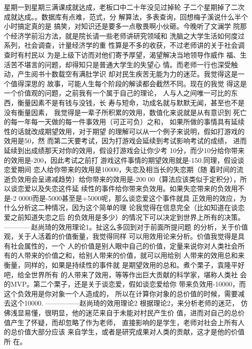星期一到星期三满课成就达成，老板口中二十年没见过掉轮
子二个星期掉了二次成就达成。。数据库有点难，范式，分
解算法，多表查询，回想梅子溪说什么半个小时搞定真的是
搞笑，对知识还是要多一点敬畏啊小伙砸。今晚听了文澜学
院那个经济学前沿方法，就是院长请一些老师讲研究领域和
洗脑之大学生活如何度过系列，社会调查，计量经济学的重
性算是不多的收获，不过老师讲的关于社会调查时有村民以
为是上级下访而对他们寄予厚望，渴望解决当地领导作威作
福、生活苦不堪言的问题，却得知只是普通大学生的失望心
情。而老师一行也深受触动，产生阅书十数载空有满肚学识
却对民生疾苦无能为力的迷茫。我觉得这是一个值得深思的
故事，可能人生每个阶段的解读都会截然不同。现在的我觉
得这是一个价值观的问题，之前我有一个属于自己的理论，
人与人之间唯一可比的东西，衡量因素不是有钱与没钱，长
寿与短命，功成名就与默默无闻，甚至也不是没有衡量因素，
我觉得是一辈子所积累的效用，数值化来说就是从有意识到
死亡的每一年每一天做的每一件事效用（可正可负）之和，
如果所做的事情具有延续性的话就改成期望效用，对于期望
的理解可以从一个例子来说明，假如打游戏的效用是50，然
而第二天要考试，因为打游戏会延续到考试影响考试的成绩，
进而延续到出成绩那天对你的效用，假设打游戏会让你少考
10分，而少10分给你带来的效用是-200，因此考试之前打
游戏这件事情的期望效用就是-150.同理，假设谈恋爱期间
恋人给你带来的效用是10000，失恋及相当长的失恋期（随
着时间的流逝负效用会呈递减趋势）给你带来的效用是-200
00（算法应该类似于定积分），所以谈恋爱以及失恋这件延
续性的事件给你带来负效用。如果失恋带来的负效用不是-2
0000而是-5000甚至是+5000呢，那么谈恋爱这个事件就具
正效用的效应，为什么分析这二种情况，因为这个简单的理
论我觉得在信息完全（比如知道在谈恋爱之前知道失恋之后
的负效用是多少）的情况下可以决定到世界上所有的决策。
————赵尚琦的效用理论1。扯这么多回到对于前面所提问题
的分析，关于价值观，关于人活着的价值衡量，我觉得同样
可以用效用论来分析。价值我觉得是具有社会属性的，一个
人的价值是别人眼中自己的价值，定量来说你对人类社会所
有的人带来的价值之和，给别人带来的价值，就可以用给别
人带来的效用总和来衡量，同样的，如果是持续性的事件就
是期望效用的总和。煮个栗子，袁隆平好吧，给全世界所有
的人带来了效用，等等作出巨大贡献的科学家，堪称人类社
会的MVP。第二个栗子，还是关于谈恋爱，假如谈恋爱给你
带来负效用-10000，而这个负效用是你对象一个人造成的，
所以在计算你对象的总价值的时候，需要减去这个10000.
—————赵尚琦的效用理论2 根据理论2，来分析老师的迷茫，
仿佛浅显易懂，很明显，他的迷茫来自于未能对村民产生价
值，进而对自己的总价值产生了怀疑，而却忽略了作为老师，
直接影响的是学生，老师对社会上所有人的总价值大部分应该
来自学生，或者是研究成果对人类的贡献，这才是他的价值所
在。


